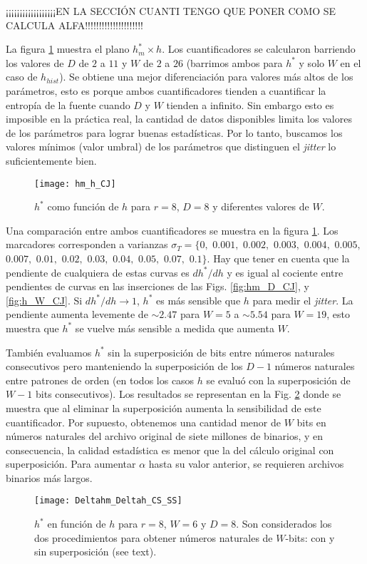 ¡¡¡¡¡¡¡¡¡¡¡¡¡¡¡¡¡¡EN LA SECCIÓN CUANTI TENGO QUE PONER COMO SE CALCULA ALFA!!!!!!!!!!!!!!!!!!!!!

La figura \ref{fig:hm_h_CJ} muestra el plano $h^*_{m} \times h$.
Los cuantificadores se calcularon barriendo los valores de $D$ de $2$ a $11$ y $W$ de $2$ a $26$ (barrimos ambos para $h^*$ y solo $W$ en el caso de $h_{hist}$).
Se obtiene una mejor diferenciación para valores más altos de los parámetros, esto es porque ambos cuantificadores tienden a cuantificar la entropía de la fuente cuando $D$ y $W$ tienden a infinito.
Sin embargo esto es imposible en la práctica real, la cantidad de datos disponibles limita los valores de los parámetros para lograr buenas estadísticas.
Por lo tanto, buscamos los valores mínimos (valor umbral) de los parámetros que distinguen el \textit{jitter} lo suficientemente bien.
%
\begin{figure}
	\centering
	\texttt{[image: hm\_h\_CJ]}
	\caption{$h^*$ como función de $h$ para $r=8$, $D=8$ y diferentes valores de $W$.}
	\label{fig:hm_h_CJ}
\end{figure}

Una comparación entre ambos cuantificadores se muestra en la figura \ref{fig:hm_h_CJ}.
Los marcadores corresponden a varianzas $\sigma_T=\{0,$ $0.001,$ $0.002,$ $0.003,$ $0.004,$ $0.005,$ $0.007,$ $0.01,$ $0.02,$ $0.03,$ $0.04,$ $0.05,$ $0.07,$ $0.1\}$.
Hay que tener en cuenta que la pendiente de cualquiera de estas curvas es $dh^*/dh$ y es igual al cociente entre pendientes de curvas en las inserciones de las Figs. \ref{fig:hm_D_CJ}, y \ref{fig:h_W_CJ}.
Si $dh^*/dh\to1$, $h^*$ es más sensible que $h$ para medir el \textit{jitter}.
La pendiente aumenta levemente de $\sim2.47$ para $W =5 $ a $\sim5.54$ para $W = 19$, esto muestra que $h^*$ se vuelve más sensible a medida que aumenta $W$.


También evaluamos $h^*$ sin la superposición de bits entre números naturales consecutivos pero manteniendo la superposición de los $D-1$ números naturales entre patrones de orden (en todos los casos $h$ se evaluó con la superposición de $W-1$ bits consecutivos).
Los resultados se representan en la Fig. \ref{fig:Deltahm_Deltah_CS_SS} donde se muestra que al eliminar la superposición aumenta la sensibilidad de este cuantificador.
Por supuesto, obtenemos una cantidad menor de $W$ bits en números naturales del archivo original de siete millones de binarios, y en consecuencia, la calidad estadística es menor que la del cálculo original con superposición.
Para aumentar $\alpha$ hasta su valor anterior, se requieren archivos binarios más largos.
%
\begin{figure}
\centering
\texttt{[image: Deltahm\_Deltah\_CS\_SS]}
\caption{$h^*$ en función de $h$ para $r=8$, $W=6$ y $D=8$. Son considerados los dos procedimientos para obtener números naturales de $W$-bits: con y sin superposición (see text).}
\label{fig:Deltahm_Deltah_CS_SS}
\end{figure}

